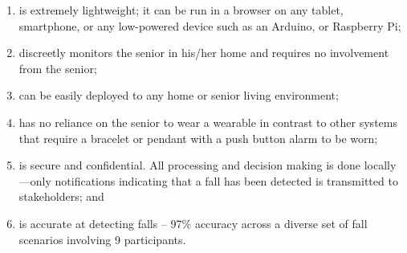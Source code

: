 \begin{enumerate}
\item is extremely lightweight; it can be run in a browser on any tablet, smartphone, or any low-powered device such as an Arduino, or Raspberry Pi;
\item discreetly monitors the senior in his/her home and requires no involvement from the senior;
\item can be easily deployed to any home or senior living environment;
\item has no reliance on the senior to wear a wearable in contrast to other systems that require a bracelet or pendant with a push button alarm to be worn;
\item is secure and confidential. All processing and decision making is done locally—only notifications indicating that a fall has been detected is transmitted to stakeholders; and
\item is accurate at detecting falls – 97\% accuracy across a diverse set of fall scenarios involving 9 participants.
 
\end{enumerate}
